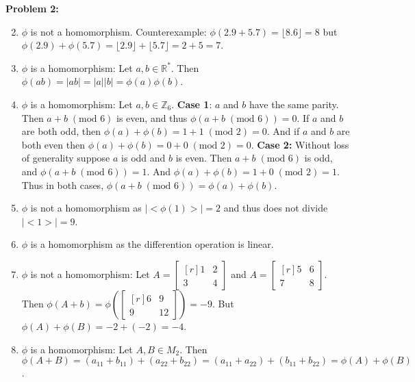 \documentclass[12pt, letterpaper]{article}
\newenvironment{problem}
    [1]
    {\noindent \textbf{Problem #1:}}
    {\vspace{3mm}}
\begin{document}
\begin{problem}{2}
    \begin{enumerate}
        \setcounter{enumi}{1}

        \item $\phi$ is not a homomorphism. Counterexample: $\phi(2.9 + 5.7) = \lfloor8.6\rfloor =
        8$ but $\phi(2.9) + \phi(5.7) = \lfloor2.9\rfloor + \lfloor5.7\rfloor = 2 + 5 = 7$.

        \item $\phi$ is a homomorphism: Let $a, b \in \mathbb{R}^*$. Then $\phi(ab) = |ab| = 
        |a||b| = \phi(a)\phi(b)$.

        \item $\phi$ is a homomorphism: Let $a, b \in \mathbb{Z}_6$. \textbf{Case 1}:
        $a$ and $b$ have the same parity. Then $a + b \; (\text{mod } 6)$ is even, and thus 
        $\phi(a + b \; (\text{mod } 6)) = 0$. If $a$ and $b$ are both odd, then $\phi(a) 
        + \phi(b) = 1 + 1 \; (\text{mod } 2) = 0$. And if $a$ and $b$ are both even then 
        $\phi(a) + \phi(b) = 0 + 0 \; (\text{mod } 2) = 0$. \textbf{Case 2:} Without loss
        of generality suppose $a$ is odd and $b$ is even. Then $a + b \; (\text{mod } 6)$
        is odd, and $\phi(a + b \; (\text{mod } 6)) = 1$. And $\phi(a) + \phi(b) = 1 + 0
        \; (\text{mod } 2) = 1$. Thus in both cases, $\phi(a + b \; (\text{mod } 6)) = \phi(a) 
        + \phi(b)$.

        \item $\phi$ is not a homomorphism as $|{<}\phi(1){>}| = 2$ and thus
        does not divide $|{<}1{>}| = 9$.

        \setcounter{enumi}{8}

        \item $\phi$ is a homomorphism as the differention operation is linear.
        
        \setcounter{enumi}{11}

        \item $\phi$ is not a homomorphism: Let $A = \begin{bmatrix*}[r] 1 & 2 \\ 3 & 4 
        \end{bmatrix*}$ and $A = \begin{bmatrix*}[r] 5 & 6 \\ 7 & 8 \end{bmatrix*}$. Then
        $\phi(A + b) = \phi(\begin{bmatrix*}[r] 6 & 9 \\ 9 & 12 \end{bmatrix*}) = -9$.
        But $\phi(A) + \phi(B) = -2 + (-2) = -4$.

        \item $\phi$ is a homomorphism: Let $A, B \in M_2$. Then $\phi(A + B) = 
        (a_{11} + b_{11}) + (a_{22} + b_{22}) = (a_{11} + a_{22}) + (b_{11} + b_{22}) = 
        \phi(A) + \phi(B)$.
    \end{enumerate}
\end{problem}
\end{document}
